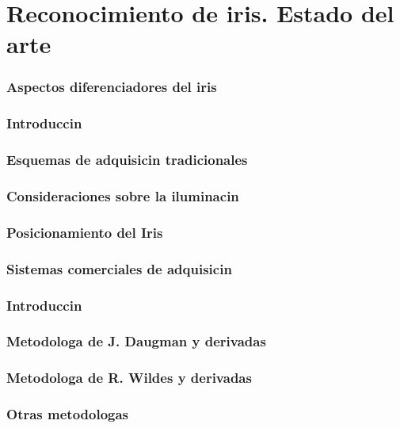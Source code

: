 \chapter{Reconocimiento de iris. Estado del arte}
\label{chap:estadodelarte}


 \label{sec:historia}

\label{sec:anatomiaojo}
\subsection{Aspectos diferenciadores del iris}


 \label{sec:adquisicion}
\subsection{Introduccin}
\subsection{Esquemas de adquisicin tradicionales}
\subsection{Consideraciones sobre la iluminacin}
\label{subsec:iluminacion}
\subsection{Posicionamiento del Iris}
\subsection{Sistemas comerciales de adquisicin}


 \label{sec:localizacion}
\subsection{Introduccin}
\subsection{Metodologa de J. Daugman y derivadas}
\subsection{Metodologa de R. Wildes y derivadas}
\subsection{Otras metodologas}
